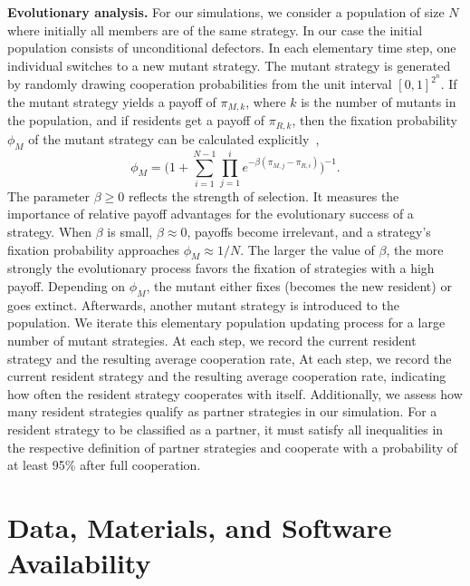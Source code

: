 \documentclass[11pt]{article}
\begin{document}
\noindent
{\bf Evolutionary analysis.} For our simulations, we consider a population of size \(N\) where initially all
members are of the same strategy. 
In our case the initial population consists of unconditional defectors. 
In each elementary time step, one individual switches to a new mutant strategy. 
The mutant strategy is generated by randomly drawing cooperation probabilities from the unit interval \([0,1]^{2^n}\). 
If the mutant strategy yields a payoff of \(\pi_{M, k}\), where \(k\) is the number of
mutants in the population, and if residents get a payoff of \(\pi_{R,
k}\), then the fixation probability \(\phi_{M}\) of the mutant strategy can be
calculated explicitly~\citep{nowak:Nature:2004},
\begin{equation}\label{eq:fixation_probability}
  \phi_{M} =\Big(1 + \displaystyle \sum_{i=1}^{N - 1} \prod_{j=1}^{i} e^{- \beta (\pi_{M, j} - \pi_{R, i})} \Big)^{-1}.
\end{equation}
The parameter \(\beta \geq 0\) reflects the strength of selection. 
It measures the importance of relative payoff advantages for the evolutionary success of a strategy. 
When \(\beta\) is small, \(\beta \approx 0\), payoffs become irrelevant, and a strategy's fixation probability approaches
\(\phi_{M} \approx 1 / N\). 
The larger the value of \(\beta\), the more strongly the evolutionary process favors the fixation of strategies with a high
payoff.
Depending on \(\phi_{M}\), the mutant either fixes (becomes the new resident) or goes extinct. 
Afterwards, another mutant strategy is introduced to the population. 
We iterate this elementary population updating process for a large number of
mutant strategies. At each step, we record the current resident strategy and the
resulting average cooperation rate, At each step, we record the current resident
strategy and the resulting average cooperation rate, indicating how often the
resident strategy cooperates with itself. Additionally, we assess how many
resident strategies qualify as partner strategies in our simulation. For a
resident strategy to be classified as a partner, it must satisfy all
inequalities in the respective definition of partner strategies and cooperate
with a probability of at least 95\% after full cooperation. 



\section*{Data, Materials, and Software Availability}
\end{document}
